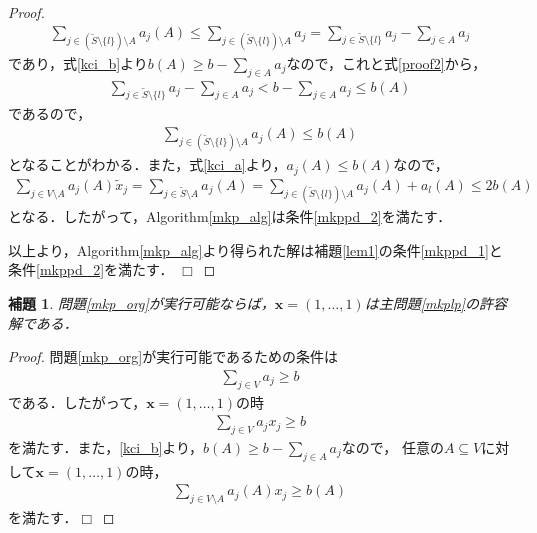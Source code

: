 \documentclass[11pt,dvipdfmx]{jarticle}
\def\qed{\hfill $\Box$}
\numberwithin{equation}{section}
\newtheorem{lem}{補題}[section]
\newtheorem{proof}{証明}
\begin{document}
\begin{proof}
                \begin{align}
                    \sum_{j\in (\tilde{S}\setminus\{l\})\setminus A}{a_j(A)}\le\sum_{j\in (\tilde{S}\setminus\{l\})\setminus A}{a_j}=\sum_{j \in\tilde{S}\setminus\{l\}}{a_j}-\sum_{j\in A}{a_j}
                \end{align}
                であり，式\eqref{kci_b}より$b(A)\ge b-\sum_{j\in A}{a_j}$なので，これと式\eqref{proof2}から，
                \begin{align}
                    \sum_{j \in\tilde{S}\setminus\{l\}}{a_j}-\sum_{j\in A}{a_j}<b-\sum_{j\in A}{a_j}\le b(A)
                \end{align}
                であるので，
                \begin{align}
                    \sum_{j\in (\tilde{S}\setminus\{l\})\setminus A}{a_j(A)}\le b(A)
                \end{align}
                となることがわかる．また，式\eqref{kci_a}より，$a_j(A)\le b(A)$なので，
                \begin{align}
                    \sum_{j\in V\setminus A}{a_j(A)\tilde{x}_j}=\sum_{j\in\tilde{S}\setminus A}{a_j(A)}=\sum_{j\in(\tilde{S}\setminus\{l\})\setminus A}{a_j(A)}+a_l(A)\le2b(A)
                \end{align}
                となる．したがって，Algorithm\ref{mkp_alg}は条件\eqref{mkppd_2}を満たす．\par
                以上より，Algorithm\ref{mkp_alg}より得られた解は補題\ref{lem1}の条件\eqref{mkppd_1}と条件\eqref{mkppd_2}を満たす．
                \qed
            \end{proof}
            \begin{lem}
                問題\eqref{mkp_org}が実行可能ならば，$\bm{x}=(1,\dotsc,1)$は主問題\eqref{mkplp}の許容解である．
                \label{lem6}
            \end{lem}
            \begin{proof}
                問題\eqref{mkp_org}が実行可能であるための条件は
                \begin{align}
                    \sum_{j\in V}{a_j}\ge b
                \end{align}
                である．したがって，$\bm{x}=(1,\dotsc,1)$の時
                \begin{align}
                    \sum_{j\in V}{a_jx_j}\ge b
                \end{align}
                を満たす．また，\eqref{kci_b}より，$b(A)\ge b-\sum_{j\in A}{a_j}$なので，
                任意の$A\subseteq V$に対して$\bm{x}=(1,\dotsc,1)$の時，
                \begin{align}
                    \sum_{j\in V\setminus A}{a_j(A)x_j}\ge b(A)
                \end{align}
                を満たす．\qed
            \end{proof}
\end{document}
